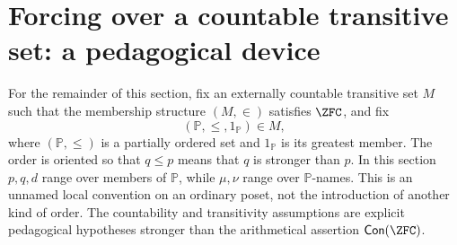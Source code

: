 \section{Forcing over a countable transitive set: a pedagogical device}
\label{sec:constructibility-forcing-02}

\begin{convention}
For the remainder of this section, fix an externally countable transitive set
\(M\) such that the membership structure \((M,\in)\) satisfies \(\ZFC\), and
fix
\[
  (\mathbb P,\leq,1_{\mathbb P})\in M,
\]
where \((\mathbb P,\leq)\) is a partially ordered set and
\(1_{\mathbb P}\) is its greatest member.  The order is oriented so that
\(q\leq p\) means that \(q\) is stronger than \(p\).  In this section
\(p,q,d\) range over members of \(\mathbb P\), while \(\mu,\nu\) range over
\(\mathbb P\)-names.  This is an unnamed local convention on an ordinary
poset, not the introduction of another kind of order.  The countability and
transitivity assumptions are explicit pedagogical hypotheses stronger than
the arithmetical assertion \(\mathsf{Con}(\ZFC)\).
\end{convention}

